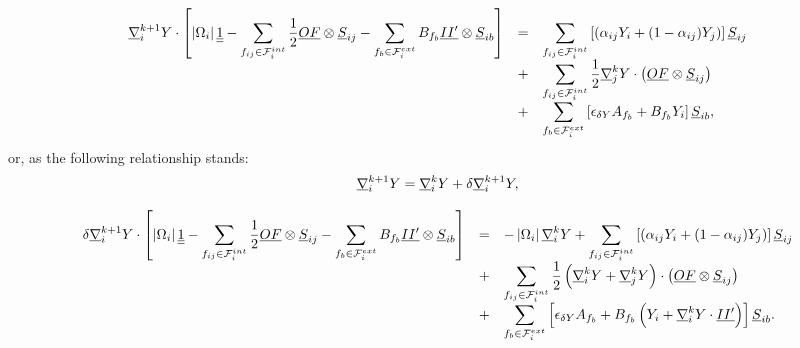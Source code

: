 \begin{equation}\label{eq:gradrc_recontruit_comp2}
\begin{array}{r c l}
\displaystyle
\underline{\nabla}_{i}^{k+1} Y \cdot \left[\left| \Omega_{i} \right| \underline{\underline{1}} -
\sum\limits_{ {f_{ij}} \in \mathcal{F}^{int}_{i}} \frac{1}{2}  \underline{O F} \otimes \underline{S}_{{ij}} -
\sum\limits_{ {f_{b}} \in \mathcal{F}^{ext}_{i}} B_{{f_{b}}} \underline{I {I^\prime}}  \otimes \underline{S}_{{ib}}  \right]
&=&
\displaystyle
\sum\limits_{{f_{ij}} \in \mathcal{F}^{int}_{i}}\left[
(\alpha_{{ij}} Y_i + (1 - \alpha_{{ij}}) Y_j)\right] \underline{S}_{{ij}} \\
&+&
\displaystyle
\sum\limits_{{f_{ij}} \in \mathcal{F}^{int}_{i}} \frac{1}{2} \underline{\nabla}_j^k Y \cdot \left( \underline{O F} \otimes \underline{S}_{{ij}} \right) \\
&+&
\displaystyle
\sum\limits_{{f_{b}} \in \mathcal{F}^{ext}_{i}}\left[ \epsilon_{\delta Y} A_{{f_{b}}} + B_{{f_{b}}} Y_i \right] \underline{S}_{{ib}},
\end{array}
\end{equation}
%
or, as the following relationship stands:
\begin{equation*}
 \underline{\nabla}_i^{k+1} Y = \underline{\nabla}_i^k Y+ \delta \underline{\nabla}_i^{k+1} Y ,
\end{equation*}

\begin{equation}\label{eq:gradrc_recontruit_increment}
\begin{array}{r c l}
\displaystyle
\delta \underline{\nabla}_{i}^{k+1} Y \cdot \left[\left| \Omega_{i} \right| \underline{\underline{1}} -
\sum\limits_{ {f_{ij}} \in \mathcal{F}^{int}_{i}} \frac{1}{2}  \underline{O F} \otimes \underline{S}_{{ij}} -
\sum\limits_{ {f_{b}} \in \mathcal{F}^{ext}_{i}} B_{{f_{b}}}  \underline{I {I^\prime}}  \otimes \underline{S}_{{ib}}  \right]
&=&
\displaystyle
 -\left| \Omega_{i} \right|  \underline{\nabla}_{i}^{k} Y +
\sum\limits_{{f_{ij}} \in \mathcal{F}^{int}_{i}}\left[
(\alpha_{{ij}} Y_i + (1 - \alpha_{{ij}}) Y_j)\right] \underline{S}_{{ij}} \\
&+&
\displaystyle
\sum\limits_{{f_{ij}} \in \mathcal{F}^{int}_{i}} \frac{1}{2}
\left(\underline{\nabla}_i^k Y + \underline{\nabla}_j^k Y \right) \cdot \left( \underline{O F} \otimes \underline{S}_{{ij}} \right) \\
&+&
\displaystyle
\sum\limits_{{f_{b}} \in \mathcal{F}^{ext}_{i}}\left[ \epsilon_{\delta Y} A_{{f_{b}}}
            + B_{{f_{b}}} \left( Y_i + \underline{\nabla}_i^k Y \cdot \underline{I {I^\prime}} \right) \right] \underline{S}_{{ib}}.
\end{array}
\end{equation}

